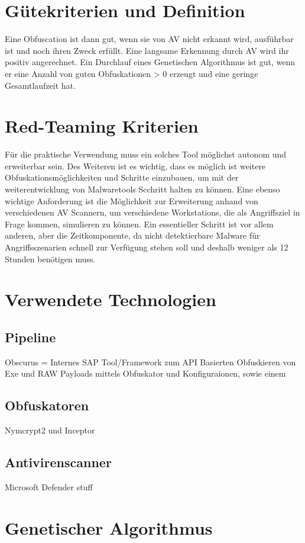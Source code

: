 \section{Gütekriterien und Definition}
Eine Obfuscation ist dann gut, wenn sie von AV nicht erkannt wird, ausführbar ist und noch ihren Zweck erfüllt. Eine langsame Erkennung durch AV wird ihr positiv angerechnet. Ein Durchlauf eines Genetischen Algorithmus ist gut, wenn er eine Anzahl von guten Obfuskationen > 0 erzeugt und eine geringe Gesamtlaufzeit hat.
\section{Red-Teaming Kriterien}
Für die praktische Verwendung muss ein solches Tool möglichst autonom und erweiterbar sein. Des Weiteren ist es wichtig, dass es möglich ist weitere Obfuskationsmöglichkeiten und Schritte einzubauen, um mit der weiterentwicklung von Malwaretools Scchritt halten zu können. Eine ebenso wichtige Anforderung ist die Möglichkeit zur Erweiterung anhand von verschiedenen AV Scannern, um verschiedene Workstations, die als Angriffsziel in Frage kommen, simulieren zu können.
Ein essentieller Schritt ist vor allem anderen, aber die Zeitkomponente, da nicht detektierbare Malware für Angriffsszenarien schnell zur Verfügung stehen soll und deshalb weniger als 12 Stunden benötigen muss.

\section{Verwendete Technologien}
    \subsection{Pipeline}
    Obscurus = Internes SAP Tool/Framework zum API Basierten Obfuskieren von Exe und RAW Payloads mittels Obfuskator und Konfiguraionen, sowie einem 
    \subsection{Obfuskatoren}
    Nymcrypt2 und Inceptor
    \subsection{Antivirenscanner}
    Microsoft Defender stuff

\section{Genetischer Algorithmus}
